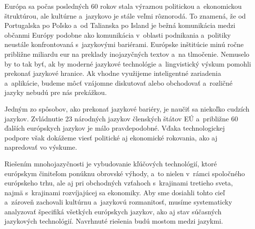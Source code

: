 Európa sa počas posledných 60 rokov stala výraznou politickou
a~ekonomickou štruktúrou, ale kultúrne a~jazykovo je stále
veľmi rôznorodá. To znamená, že od Portugalska po Poľsko
a~od Talianska po Island je bežná komunikácia medzi občanmi Európy podobne ako komunikácia v~oblasti podnikania a~politiky neustále konfrontovaná s~jazykovými bariérami. Európske inštitúcie minú ročne približne miliardu eur na preklady inojazyčných textov a~na tlmočenie. Nemuselo by to tak byť, ak by moderné jazykové technológie a~lingvistický výskum pomohli prekonať jazykové hranice. Ak vhodne využijeme inteligentné zariadenia a~aplikácie, budeme môcť vzájomne diskutovať alebo obchodovať a~rozličné jazyky nebudú pre nás prekážkou.

Jedným zo spôsobov, ako prekonať jazykové bariéry, je naučiť sa niekoľko cudzích jazykov. Zvládnutie 23 národných jazykov členských štátov EÚ a~približne 60 ďalších európskych jazykov je málo pravdepodobné. Vďaka technologickej podpore však dokážeme viesť politické aj ekonomické rokovania, ako aj napredovať vo výskume.

Riešením mnohojazyčnosti je vybudovanie kľúčových technológií, ktoré európskym činiteľom ponúknu obrovské výhody, a~to nielen v~rámci
spoločného európskeho trhu, ale aj pri obchodných vzťahoch s~krajinami 
tretieho sveta, najmä s~krajinami rozvíjajúcej sa ekonomiky. Aby sme dosiahli tohto cieľ a~zároveň zachovali kultúrnu a~jazykovú rozmanitosť, musíme systematicky analyzovať špecifiká všetkých európskych jazykov, ako aj stav súčasných jazykových technológií. Navrhnuté riešenia budú mostom medzi jazykmi. 
